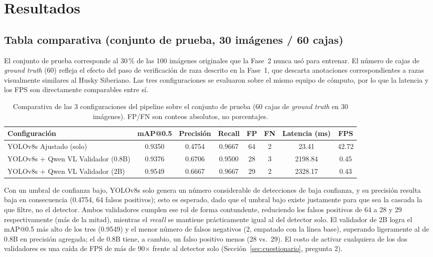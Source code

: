 \documentclass[11pt]{article}
\begin{document}
\section{Resultados}

\subsection{Tabla comparativa (conjunto de prueba, 30 imágenes / 60 cajas)}
\label{sec:tabla-test}

El conjunto de prueba corresponde al 30\,\% de las 100 imágenes originales que la Fase~2 nunca
usó para entrenar. El número de cajas de \textit{ground truth} (60) refleja el efecto del paso
de verificación de raza descrito en la Fase~1, que descarta anotaciones correspondientes a
razas visualmente similares al Husky Siberiano. Las tres configuraciones se evaluaron sobre el
mismo equipo de cómputo, por lo que la latencia y los FPS son directamente comparables entre
sí.

\begin{table}[H]
\centering
\small
\begin{tabular}{lccccccc}
\toprule
\textbf{Configuración} & \textbf{mAP@0.5} & \textbf{Precisión} & \textbf{Recall} &
\textbf{FP} & \textbf{FN} & \textbf{Latencia (ms)} & \textbf{FPS} \\
\midrule
YOLOv8s Ajustado (solo)          & 0.9350 & 0.4754 & 0.9667 & 64 & 2 & 23.41   & 42.72 \\
YOLOv8s + Qwen VL Validador (0.8B) & 0.9376 & 0.6706 & 0.9500 & 28 & 3 & 2198.84 & 0.45 \\
YOLOv8s + Qwen VL Validador (2B)   & 0.9549 & 0.6667 & 0.9667 & 29 & 2 & 2328.17 & 0.43 \\
\bottomrule
\end{tabular}
\caption{Comparativa de las 3 configuraciones del pipeline sobre el conjunto de prueba (60
cajas de \textit{ground truth} en 30 imágenes). FP/FN son conteos absolutos, no porcentajes.}
\label{tab:comparativa-test}
\end{table}

Con un umbral de confianza bajo, YOLOv8s solo genera un número considerable de detecciones de
baja confianza, y su precisión resulta baja en consecuencia (0.4754, 64 falsos positivos); esto
es esperado, dado que el umbral bajo existe justamente para que sea la cascada la que filtre, no
el detector. Ambos validadores cumplen ese rol de forma contundente, reduciendo los falsos
positivos de 64 a 28 y 29 respectivamente (más de la mitad), mientras el \textit{recall} se
mantiene prácticamente igual al del detector solo. El validador de 2B logra el mAP@0.5 más alto
de los tres (0.9549) y el menor número de falsos negativos (2, empatado con la línea base),
superando ligeramente al de 0.8B en precisión agregada; el de 0.8B tiene, a cambio, un falso
positivo menos (28 vs.\ 29). El costo de activar cualquiera de los dos validadores es una caída
de FPS de más de 90$\times$ frente al detector solo (Sección~\ref{sec:cuestionario}, pregunta
2).
\end{document}
